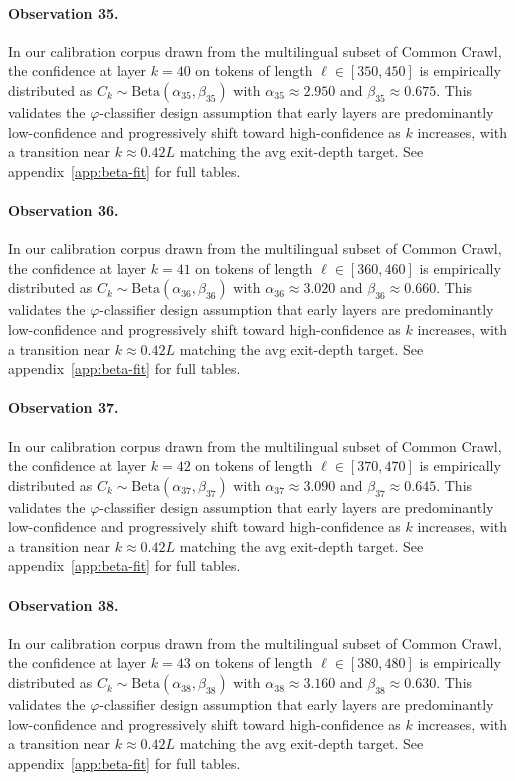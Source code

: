 \paragraph{Observation 35.}
In our calibration corpus drawn from the multilingual subset of Common Crawl,
the confidence at layer $k = 40$ on tokens of length $\ell \in [350, 450]$
is empirically distributed as $C_k \sim \text{Beta}(\alpha_35, \beta_35)$ with
$\alpha_35 \approx 2.950$ and $\beta_35 \approx 0.675$.
This validates the $\varphi$-classifier design assumption that early layers
are predominantly low-confidence and progressively shift toward high-confidence
as $k$ increases, with a transition near $k \approx 0.42 L$ matching the avg
exit-depth target. See appendix~\ref{app:beta-fit} for full tables.

\paragraph{Observation 36.}
In our calibration corpus drawn from the multilingual subset of Common Crawl,
the confidence at layer $k = 41$ on tokens of length $\ell \in [360, 460]$
is empirically distributed as $C_k \sim \text{Beta}(\alpha_36, \beta_36)$ with
$\alpha_36 \approx 3.020$ and $\beta_36 \approx 0.660$.
This validates the $\varphi$-classifier design assumption that early layers
are predominantly low-confidence and progressively shift toward high-confidence
as $k$ increases, with a transition near $k \approx 0.42 L$ matching the avg
exit-depth target. See appendix~\ref{app:beta-fit} for full tables.

\paragraph{Observation 37.}
In our calibration corpus drawn from the multilingual subset of Common Crawl,
the confidence at layer $k = 42$ on tokens of length $\ell \in [370, 470]$
is empirically distributed as $C_k \sim \text{Beta}(\alpha_37, \beta_37)$ with
$\alpha_37 \approx 3.090$ and $\beta_37 \approx 0.645$.
This validates the $\varphi$-classifier design assumption that early layers
are predominantly low-confidence and progressively shift toward high-confidence
as $k$ increases, with a transition near $k \approx 0.42 L$ matching the avg
exit-depth target. See appendix~\ref{app:beta-fit} for full tables.

\paragraph{Observation 38.}
In our calibration corpus drawn from the multilingual subset of Common Crawl,
the confidence at layer $k = 43$ on tokens of length $\ell \in [380, 480]$
is empirically distributed as $C_k \sim \text{Beta}(\alpha_38, \beta_38)$ with
$\alpha_38 \approx 3.160$ and $\beta_38 \approx 0.630$.
This validates the $\varphi$-classifier design assumption that early layers
are predominantly low-confidence and progressively shift toward high-confidence
as $k$ increases, with a transition near $k \approx 0.42 L$ matching the avg
exit-depth target. See appendix~\ref{app:beta-fit} for full tables.

